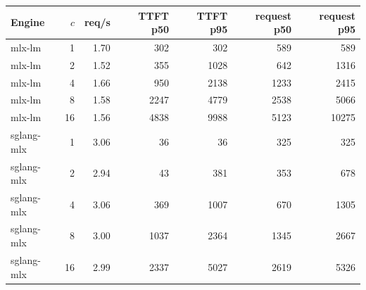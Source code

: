 \begin{tabular}{lrrrrrr}
\toprule
Engine & $c$ & req/s & TTFT p50 & TTFT p95 & request p50 & request p95 \\
\midrule
mlx-lm & 1 & 1.70 & 302 & 302 & 589 & 589 \\
mlx-lm & 2 & 1.52 & 355 & 1028 & 642 & 1316 \\
mlx-lm & 4 & 1.66 & 950 & 2138 & 1233 & 2415 \\
mlx-lm & 8 & 1.58 & 2247 & 4779 & 2538 & 5066 \\
mlx-lm & 16 & 1.56 & 4838 & 9988 & 5123 & 10275 \\
sglang-mlx & 1 & 3.06 & 36 & 36 & 325 & 325 \\
sglang-mlx & 2 & 2.94 & 43 & 381 & 353 & 678 \\
sglang-mlx & 4 & 3.06 & 369 & 1007 & 670 & 1305 \\
sglang-mlx & 8 & 3.00 & 1037 & 2364 & 1345 & 2667 \\
sglang-mlx & 16 & 2.99 & 2337 & 5027 & 2619 & 5326 \\
\bottomrule
\end{tabular}
